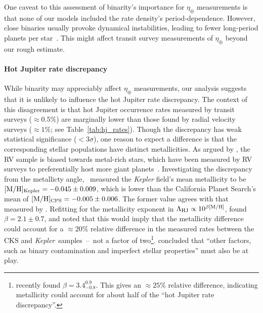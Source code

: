 \documentclass[12pt,modern]{aastex61}
\begin{document}
One caveat to this assessment of binarity's importance for 
$\eta_\oplus$ measurements is that none of our models 
included the rate density's period-dependence. However, close binaries usually
provoke dynamical instabilities, leading to fewer long-period planets per 
star~\citep[\textit{e.g.},][]{holman_long-term_1999,wang_influence_2014,
    kraus_impact_2016}.
This might affect transit survey measurements of $\eta_\oplus$ beyond our 
rough estimate.

\paragraph{Hot Jupiter rate discrepancy}
While binarity may appreciably affect $\eta_\oplus$ measurements, our analysis
suggests that it is unlikely to influence the hot Jupiter rate discrepancy.
The context of this disagreement is that hot Jupiter occurrence rates measured 
by transit surveys ($\approx 0.5\%$) are marginally lower than those found by 
radial velocity surveys ($\approx 1\%$; see Table~\ref{tab:hj_rates}).
Though the discrepancy has weak statistical significance ($<3\sigma$),
one reason to expect a difference is that the corresponding stellar 
populations have distinct metallicities.
As argued by \citet{gould_frequency_2006}, the RV sample is biased towards 
metal-rich stars, which have been measured by RV surveys to preferentially 
host more giant 
planets~\citep{santos_spectroscopic_2004,fischer_planet-metallicity_2005}.
Investigating the discrepancy from the metallicty 
angle,~\citet{guo_metallicity_2017} measured the
{\it Kepler} field's mean metallicity to be $[{\rm M/H}]_{\rm Kepler}= 
-0.045\pm0.009$, which is lower than the California Planet Search's mean of 
$[{\rm M/H}]_{\rm CPS}= -0.005\pm0.006$.
The former value agrees with that measured by \citet{dong_metallicities_2014}.
Refitting for the metallicity exponent in $\Lambda_{\rm HJ} \propto 10^{\beta 
    [{\rm M/H}] }$, \citeauthor{guo_metallicity_2017}\! found $\beta = 2.1\pm 
0.7$, and noted that this would imply that the metallicity difference could 
account for a $\approx 20\%$ relative difference in the measured rates between 
the CKS and {\it Kepler}\ samples~--~not a factor of two\footnote{
    \citet{petigura_CKS_2017} recently found $\beta = 3.4^{0.9}_{-0.8}$.
    This gives an $\approx 25\%$ relative difference, indicating metallicity 
    could 
    account for about half of the ``hot Jupiter rate discrepancy''.
}.
\citeauthor{guo_metallicity_2017}\! concluded that ``other factors, such as 
binary contamination and imperfect stellar properties'' must also be at play.
\end{document}

